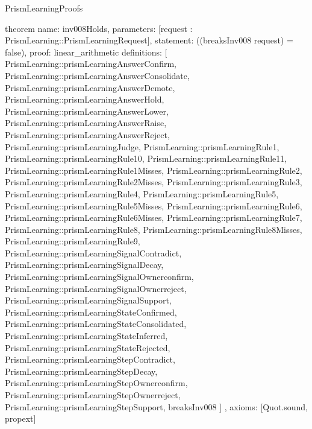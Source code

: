 \begin{lexlean}{PrismLearningProofs}
\begin{semanticmodule}
theorem{
  name: inv008Holds,
  parameters: [request : PrismLearning::PrismLearningRequest],
  statement: ((breaksInv008 request) = false),
  proof: linear_arithmetic{
    definitions: [
      PrismLearning::prismLearningAnswerConfirm,
      PrismLearning::prismLearningAnswerConsolidate,
      PrismLearning::prismLearningAnswerDemote,
      PrismLearning::prismLearningAnswerHold,
      PrismLearning::prismLearningAnswerLower,
      PrismLearning::prismLearningAnswerRaise,
      PrismLearning::prismLearningAnswerReject,
      PrismLearning::prismLearningJudge,
      PrismLearning::prismLearningRule1,
      PrismLearning::prismLearningRule10,
      PrismLearning::prismLearningRule11,
      PrismLearning::prismLearningRule1Misses,
      PrismLearning::prismLearningRule2,
      PrismLearning::prismLearningRule2Misses,
      PrismLearning::prismLearningRule3,
      PrismLearning::prismLearningRule4,
      PrismLearning::prismLearningRule5,
      PrismLearning::prismLearningRule5Misses,
      PrismLearning::prismLearningRule6,
      PrismLearning::prismLearningRule6Misses,
      PrismLearning::prismLearningRule7,
      PrismLearning::prismLearningRule8,
      PrismLearning::prismLearningRule8Misses,
      PrismLearning::prismLearningRule9,
      PrismLearning::prismLearningSignalContradict,
      PrismLearning::prismLearningSignalDecay,
      PrismLearning::prismLearningSignalOwnerconfirm,
      PrismLearning::prismLearningSignalOwnerreject,
      PrismLearning::prismLearningSignalSupport,
      PrismLearning::prismLearningStateConfirmed,
      PrismLearning::prismLearningStateConsolidated,
      PrismLearning::prismLearningStateInferred,
      PrismLearning::prismLearningStateRejected,
      PrismLearning::prismLearningStepContradict,
      PrismLearning::prismLearningStepDecay,
      PrismLearning::prismLearningStepOwnerconfirm,
      PrismLearning::prismLearningStepOwnerreject,
      PrismLearning::prismLearningStepSupport,
      breaksInv008
    ]
  },
  axioms: [Quot.sound, propext]
}
\end{semanticmodule}
\end{lexlean}
